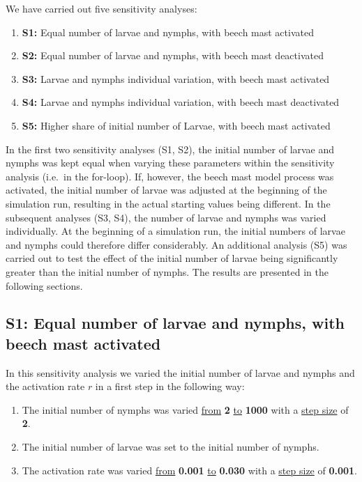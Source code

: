 \documentclass[a4paper, 11pt]{scrartcl}
\begin{document}
We have carried out five sensitivity analyses:

\begin{enumerate}
\item[] \textbf{S1:} Equal number of larvae and nymphs, with beech mast activated
\item[] \textbf{S2:} Equal number of larvae and nymphs, with beech mast deactivated
\item[] \textbf{S3:} Larvae and nymphs individual variation, with beech mast activated
\item[] \textbf{S4:} Larvae and nymphs individual variation, with beech mast deactivated
\item[] \textbf{S5:} Higher share of initial number of Larvae, with beech mast activated
\end{enumerate}

In the first two sensitivity analyses (S1, S2), the initial number of larvae and nymphs was kept equal when varying these parameters within the sensitivity analysis (i.e.\ in
the for-loop). If, however, the beech mast model process was activated, the initial number of larvae was adjusted at the beginning of the simulation run, resulting in the actual
starting values being different. In the subsequent analyses (S3, S4), the number of larvae and nymphs was varied individually. At the beginning of a simulation run, the initial
numbers of larvae and nymphs could therefore differ considerably. An additional analysis (S5) was carried out to test the effect of the initial number of larvae being
significantly greater than the initial number of nymphs. The results are presented in the following sections.


\subsection{S1: Equal number of larvae and nymphs, with beech mast activated}
In this sensitivity analysis we varied the initial number of larvae and nymphs and the activation rate $r$ in a first step in the following way:

\begin{enumerate}
\item The initial number of nymphs was varied \underline{from} \textbf{2} \underline{to} \textbf{1000} with a \underline{step size} of \textbf{2}.
\item The initial number of larvae was set to the initial number of nymphs.
\item The activation rate was varied \underline{from} \textbf{0.001} \underline{to} \textbf{0.030} with a \underline{step size} of \textbf{0.001}.
\end{enumerate}
\end{document}

